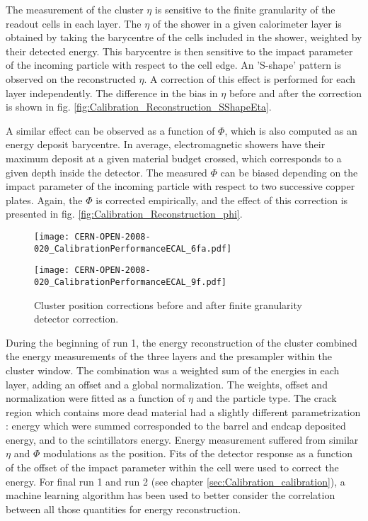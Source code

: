 The measurement of the cluster $\eta$ is sensitive to the finite granularity of the readout cells in each layer.
The $\eta$ of the shower in a given calorimeter layer is obtained by taking the barycentre of the cells included in the shower, weighted by their detected energy.
This barycentre is then sensitive to the impact parameter of the incoming particle with respect to the cell edge.
An 'S-shape' pattern is observed on the reconstructed $\eta$.
A correction of this effect is performed for each layer independently.
The difference in the bias in $\eta$ before and after the correction is shown in fig. \ref{fig:Calibration_Reconstruction_SShapeEta}.

A similar effect can be observed as a function of $\Phi$, which is also computed as an energy deposit barycentre.
In average, electromagnetic showers have their maximum deposit at a given material budget crossed, which corresponds to a given depth inside the detector.
The measured $\Phi$ can be biased depending on the impact parameter of the incoming particle with respect to two successive copper plates.
Again, the $\Phi$ is corrected empirically, and the effect of this correction is presented in fig. \ref{fig:Calibration_Reconstruction_phi}.

\begin{figure}
  \begin{minipage}{.49\linewidth}
    \centering \texttt{[image: CERN-OPEN-2008-020\_CalibrationPerformanceECAL\_6fa.pdf]}
    \label{fig:Calibration_Reconstruction_SShapeEta}
  \end{minipage}
  \hfill
  \begin{minipage}{.49\linewidth}
    \centering \texttt{[image: CERN-OPEN-2008-020\_CalibrationPerformanceECAL\_9f.pdf]}
    \label{fig:Calibration_Reconstruction_phi}
  \end{minipage}
  \caption{Cluster position corrections before and after finite granularity detector correction.}\label{fig:1}
\end{figure}


During the beginning of run 1, the energy reconstruction of the cluster combined the energy measurements of the three layers and the presampler within the cluster window.
The combination was a weighted sum of the energies in each layer, adding an offset and a global normalization.
The weights, offset and normalization were fitted as a function of $\eta$ and the particle type.
The crack region which contains more dead material had a slightly different parametrization : energy which were summed corresponded to the barrel and endcap deposited energy, and to the scintillators energy.
Energy measurement suffered from similar $\eta$ and $\Phi$ modulations as the position.
Fits of the detector response as a function of the offset of the impact parameter within the cell were used to correct the energy.
For final run 1 and run 2 (see chapter \ref{sec:Calibration_calibration}), a machine learning algorithm has been used to better consider the correlation between all those quantities for energy reconstruction.

